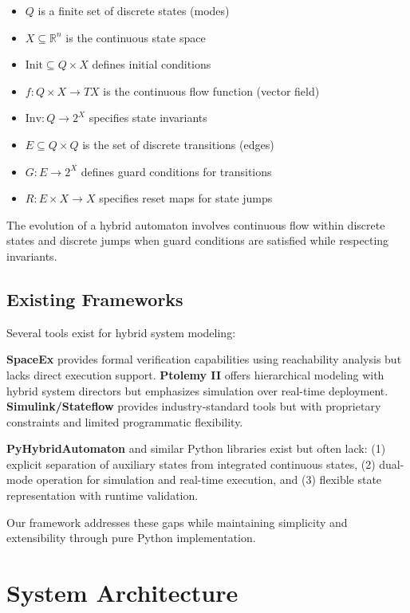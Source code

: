 \documentclass[conference]{IEEEtran}
\begin{document}
\begin{itemize}
\item $Q$ is a finite set of discrete states (modes)
\item $X \subseteq \mathbb{R}^n$ is the continuous state space
\item $\text{Init} \subseteq Q \times X$ defines initial conditions
\item $f: Q \times X \rightarrow TX$ is the continuous flow function (vector field)
\item $\text{Inv}: Q \rightarrow 2^X$ specifies state invariants
\item $E \subseteq Q \times Q$ is the set of discrete transitions (edges)
\item $G: E \rightarrow 2^X$ defines guard conditions for transitions
\item $R: E \times X \rightarrow X$ specifies reset maps for state jumps
\end{itemize}

The evolution of a hybrid automaton involves continuous flow within discrete states and discrete jumps when guard conditions are satisfied while respecting invariants.

\subsection{Existing Frameworks}

Several tools exist for hybrid system modeling:

\textbf{SpaceEx} provides formal verification capabilities using reachability analysis but lacks direct execution support. \textbf{Ptolemy II} offers hierarchical modeling with hybrid system directors but emphasizes simulation over real-time deployment. \textbf{Simulink/Stateflow} provides industry-standard tools but with proprietary constraints and limited programmatic flexibility.

\textbf{PyHybridAutomaton} and similar Python libraries exist but often lack: (1) explicit separation of auxiliary states from integrated continuous states, (2) dual-mode operation for simulation and real-time execution, and (3) flexible state representation with runtime validation.

Our framework addresses these gaps while maintaining simplicity and extensibility through pure Python implementation.

\section{System Architecture}
\end{document}
